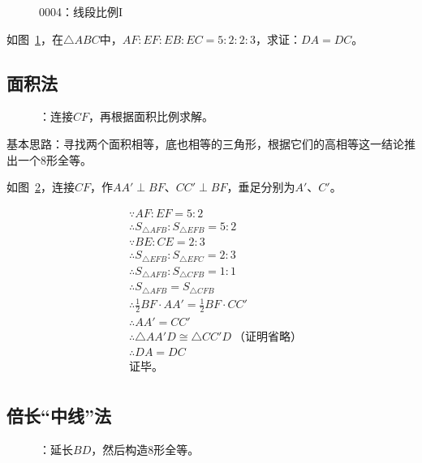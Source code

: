 

\begin{figure}[htbp]
  \centering
  \caption{0004：线段比例I} \label{fig:0004}
\end{figure}

如图~\ref{fig:0004}，在$\triangle ABC$中，$AF:EF:EB:EC = 5:2:2:3$，求证：$DA = DC$。

\subsection{面积法} \label{subsec:0004-S}

\begin{figure}[htbp]
  \centering
  \caption{：连接$CF$，再根据面积比例求解。} \label{fig:0004-S}
\end{figure}

基本思路：寻找两个面积相等，底也相等的三角形，根据它们的高相等这一结论推出一个8形全等。

如图~\ref{fig:0004-S}，连接$CF$，作$AA' \perp BF$、$CC' \perp BF$，垂足分别为$A'$、$C'$。

\begin{align*}
  &\because   AF:EF = 5:2 \\
  &\therefore S_{\triangle AFB}:S_{\triangle EFB} = 5:2 \\
  &\because   BE:CE = 2:3 \\
  &\therefore S_{\triangle EFB}:S_{\triangle EFC} = 2:3 \\
  &\therefore S_{\triangle AFB}:S_{\triangle CFB} = 1:1 \\
  &\therefore S_{\triangle AFB} = S_{\triangle CFB} \\
  &\therefore \frac12BF \cdot AA' = \frac12BF \cdot CC' \\
  &\therefore AA' = CC' \\
  &\therefore \triangle AA'D \cong \triangle CC'D \ \text{（证明省略）} \\
  &\therefore DA = DC \\
  &\text{证毕。} \\
\end{align*}

\subsection{倍长“中线”法} \label{subsec:0004-mid}

\begin{figure}[htbp]
  \centering
  \caption{：延长$BD$，然后构造8形全等。} \label{fig:0004-mid}
\end{figure}


